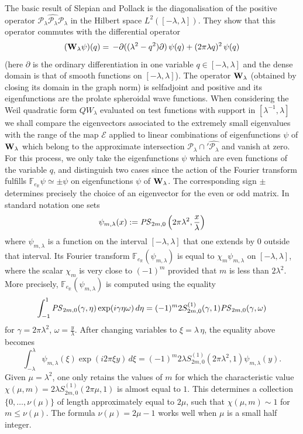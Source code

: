 \documentclass[cupthm]{CUP-JNL-JMJ}
\def\F{{\mathbb F}}
\def\R{{\mathbb R}}
\def\cE{{\mathcal E}}
\def\cP{{\mathcal P}}
\def\fourier{\F}
\numberwithin{equation}{section}
\theoremstyle{cupplain}
\theoremstyle{cupdefinition}
\theoremstyle{cupremark}
\theoremstyle{cupproof}
\begin{document}
The basic result of Slepian and Pollack is the diagonalisation of the positive operator $\cP_\lambda \widehat{\cP_\lambda}\cP_\lambda$ in the Hilbert space $L^2([-\lambda,\lambda])$. They show  that this operator  commutes with the differential operator 
\begin{equation}
({\bf W}_{\lambda}\psi)(q) = \,- \partial (( \lambda^2- q^2) \partial )\,
\psi(q) + (2 \pi \lambda  q)^2 \, \psi(q)  \label{WLambdaq}
\end{equation}
(here $\partial$ is the ordinary differentiation in one
variable $q\in [-\lambda,\lambda]$ and the dense domain is that of smooth functions on $[-\lambda,\lambda]$). The operator ${\bf W}_{\lambda}$ (obtained by closing its domain in the graph norm) is selfadjoint and positive and its eigenfunctions are the prolate spheroidal wave functions. When considering  the Weil quadratic form $QW_\lambda$ evaluated on test functions with support in $[\lambda^{-1},\lambda]$ we shall compare the eigenvectors associated to the extremely small eigenvalues with the range of the map $\cE$ applied to linear combinations of  eigenfunctions $\psi$ of ${\bf W}_{\lambda}$   which belong to the approximate  intersection $\cP_\lambda \cap'\widehat{\cP_\lambda}$ and  vanish at zero.  For this process, we only take the eigenfunctions $\psi$   which are even functions of the variable $q$, and  distinguish two cases since the action of the Fourier transform  fulfills $\fourier_{e_\R}\psi\simeq \pm \psi$ on eigenfunctions $\psi$ of ${\bf W}_{\lambda}$. The corresponding  sign $\pm$  determines precisely the choice of  an eigenvector for the even or odd matrix. In standard notation one sets
 $$
\psi_{m,\lambda}(x):=\text{\textit{PS}}_{2m,0}\left(2 \pi  \lambda^2,\frac{x}{\lambda}\right)
$$
where $\psi_{m,\lambda}$ is a function on the interval $[-\lambda,\lambda]$ that one extends by $0$ outside that interval. Its Fourier transform $\fourier_{e_\R}(\psi_{m,\lambda})$ is equal to $\chi_m\psi_{m,\lambda}$ on  $[-\lambda,\lambda]$, where the scalar $\chi_m$ is very close to $(-1)^m$ provided that $m$ is less than $2 \lambda^2$. More precisely,  $\fourier_{e_\R}(\psi_{m,\lambda})$  is computed using  the equality
 $$
 \int_{-1}^1 \text{\textit{PS}}_{2m,0}(\gamma ,\eta ) \exp (i \gamma  \eta  \omega ) \, d\eta=(-1)^m 2 S_{2m,0}^{(1)}(\gamma ,1) \text{\textit{PS}}_{2m,0}(\gamma ,\omega )
 $$
 for $\gamma=2\pi \lambda^2$, $\omega=\frac{y}{\lambda}$. After changing variables to $\xi=\lambda\,\eta$, the equality above becomes
 $$
 \int_{-\lambda}^{\lambda}\psi_{m,\lambda}(\xi) \exp (i 2\pi \xi y ) \, d\xi=(-1)^m2 \lambda S_{2m,0}^{(1)}(2 \pi \lambda^2 ,1) \psi_{m,\lambda}(y).
 $$
 Given $\mu=\lambda^2$, one only retains the values of $m$ for which the characteristic value 
 $
 \chi(\mu,m)=2\lambda  S_{2m,0}^{(1)}(2 \pi \mu ,1)
 $
 is almost equal to $1$. This determines a collection $\{0, \ldots, \nu(\mu)\}$ of length  approximately equal to $2\mu$, such that  $\chi(\mu,m)\sim 1$ for $m\leq \nu(\mu)$. The formula $\nu(\mu)=2\mu-1$ works well when $\mu$ is a small half integer.
\end{document}
